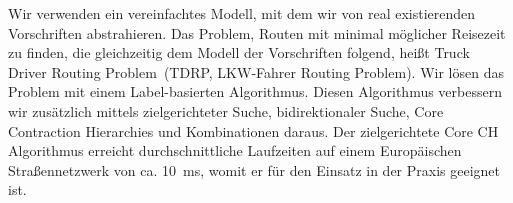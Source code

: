 \documentclass{thesisclass}
\begin{document}
\begin{addmargin}{0.5cm}
	Wir verwenden ein vereinfachtes Modell, mit dem wir von real existierenden Vorschriften abstrahieren. Das Problem, Routen mit minimal möglicher Reisezeit zu finden, die gleichzeitig dem Modell der Vorschriften folgend, heißt \glqq Truck Driver Routing Problem\grqq\ (TDRP, \glqq LKW-Fahrer Routing Problem\grqq).  Wir lösen das Problem mit einem Label-basierten Algorithmus. Diesen Algorithmus verbessern wir zusätzlich mittels zielgerichteter Suche, bidirektionaler Suche, Core Contraction Hierarchies und Kombinationen daraus. Der zielgerichtete Core CH Algorithmus erreicht durchschnittliche Laufzeiten auf einem Europäischen Straßennetzwerk von ca. \SI{10}{\milli\second}, womit er für den Einsatz in der Praxis geeignet ist.
\end{addmargin}

\blankpage


\tableofcontents
\blankpage
\listoffigures
\listoftables
\listofalgorithms
\cleardoublepage



\mainmatter
{}










\cleardoublepage
{}
{}

{} %
{} %

% 





\cleardoublepage

\end{document}
